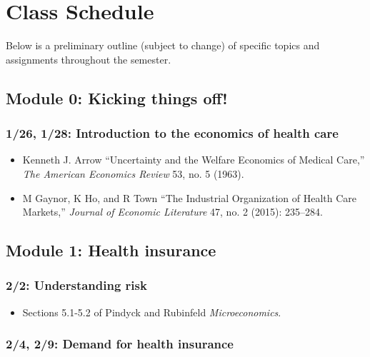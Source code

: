 \documentclass[11pt,]{article}
\providecommand{\tightlist}{%
  \setlength{\itemsep}{0pt}\setlength{\parskip}{0pt}}
\begin{document}
\hypertarget{class-schedule}{%
\section{Class Schedule}\label{class-schedule}}

Below is a preliminary outline (subject to change) of specific topics
and assignments throughout the semester.

\hypertarget{module-0-kicking-things-off}{%
\subsection{Module 0: Kicking things
off!}\label{module-0-kicking-things-off}}

\hypertarget{introduction-to-the-economics-of-health-care}{%
\subsubsection{1/26, 1/28: Introduction to the economics of health
care}\label{introduction-to-the-economics-of-health-care}}

\begin{itemize}
\tightlist
\item
  Kenneth J. Arrow ``Uncertainty and the Welfare Economics of Medical
  Care,'' \emph{The American Economics Review} 53, no. 5 (1963).
\item
  M Gaynor, K Ho, and R Town ``The Industrial Organization of Health
  Care Markets,'' \emph{Journal of Economic Literature} 47, no. 2
  (2015): 235--284.
\end{itemize}

\hypertarget{module-1-health-insurance}{%
\subsection{Module 1: Health
insurance}\label{module-1-health-insurance}}

\hypertarget{understanding-risk}{%
\subsubsection{2/2: Understanding risk}\label{understanding-risk}}

\begin{itemize}
\tightlist
\item
  Sections 5.1-5.2 of Pindyck and Rubinfeld \emph{Microeconomics}.
\end{itemize}

\hypertarget{demand-for-health-insurance}{%
\subsubsection{2/4, 2/9: Demand for health
insurance}\label{demand-for-health-insurance}}
\end{document}
